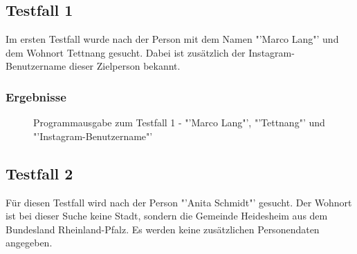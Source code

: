 	\subsection{Testfall 1}
	\label{subsec:Testfall1}
	Im ersten Testfall wurde nach der Person mit dem Namen "'Marco Lang"' und dem Wohnort Tettnang gesucht. Dabei ist zusätzlich der Instagram-Benutzername dieser Zielperson bekannt.
	\newpage
	\subsubsection{Ergebnisse}
		\begin{figure}[h!]
			\caption{Programmausgabe zum Testfall 1 - "'Marco Lang"', "'Tettnang"' und "'Instagram-Benutzername"'}
		\end{figure}
		\FloatBarrier
	\subsection{Testfall 2}
	\label{subsec:Testfall2}
	Für diesen Testfall wird nach der Person "'Anita Schmidt"' gesucht. Der Wohnort ist bei dieser Suche keine Stadt, sondern die Gemeinde Heidesheim aus dem Bundesland Rheinland-Pfalz. Es werden keine zusätzlichen Personendaten angegeben.
	\newpage
